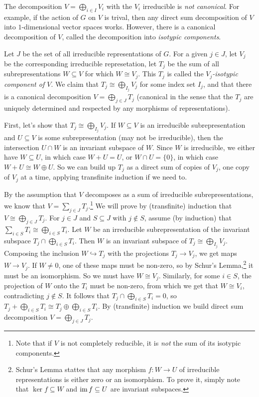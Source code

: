 \begin{remark}\label{lec2Rmk:isotypic}
 The decomposition $V= \bigoplus_{i\in I}V_i$ with the $V_i$ irreducible is \emph{not canonical}. For example, if the action of $G$ on $V$ is trival, then any direct sum decomposition of $V$ into $1$-dimensional vector spaces works. However, there is a canonical decomposition of $V$, called the decomposition into \emph{isotypic components}.
 
 Let $J$ be the set of all irreducible representations of $G$. For a given $j\in J$, let $V_j$ be the corresponding irreducible represetation, let $T_j$ be the sum of all subrepresentations $W\subseteq V$ for which $W\cong V_j$. This $T_j$ is called the \emph{$V_j$-isotypic component of $V$}. We claim that $T_j\cong \bigoplus_{I_j} V_j$ for some index set $I_j$, and that there is a canonical decomposition $V=\bigoplus_{j\in J} T_j$ (canonical in the sense that the $T_j$ are uniquely determined and respected by any morphisms of representations).
 
 First, let's show that $T_j\cong \bigoplus_{I_j} V_j$. If $W\subseteq V$ is an irreducible subrepresentation and $U\subseteq V$ is some subrepresentation (may not be irreducible), then the intersection $U\cap W$ is an invariant subspace of $W$. Since $W$ is irreducible, we either have $W\subseteq U$, in which case $W+U=U$, or $W\cap U=\{0\}$, in which case $W+U\cong W\oplus U$. So we can build up $T_j$ as a direct sum of copies of $V_j$, one copy of $V_j$ at a time, applying transfinite induction if we need to.
 
 By the assumption that $V$ decomposes as a sum of irreducible subrepresentations, we know that $V=\sum_{j\in J} T_j$.\footnote{Note that if $V$ is not completely reducible, it is \emph{not} the sum of its isotypic components.} We will prove by (transfinite) induction that $V\cong \bigoplus_{j\in J}T_j$. For $j\in J$ and $S\subseteq J$ with $j\not\in S$, assume (by induction) that $\sum_{i\in S} T_i\cong \bigoplus_{i\in S}T_i$. Let $W$ be an irreducible subrepresentation of the invariant subspace $T_j\cap \bigoplus_{i\in S}T_i$. Then $W$ is an invariant subspace of $T_j\cong \bigoplus_{I_j} V_j$. Composing the inclusion $W\hookrightarrow T_j$ with the projections $T_j\to V_j$, we get maps $W\to V_j$. If $W\neq 0$, one of these maps must be non-zero, so by Schur's Lemma,\footnote{Schur's Lemma stattes that any morphism $f\colon W\to U$ of irreducible representations is either zero or an isomorphism. To prove it, simply note that $\ker f\subseteq W$ and $\operatorname{im} f\subseteq U$ are invariant subspaces.} it must be an isomorphism. So we must have $W\cong V_j$. Similarly, for some $i\in S$, the projection of $W$ onto the $T_i$ must be non-zero, from which we get that $W\cong V_i$, contradicting $j\not\in S$. It follows that $T_j\cap \bigoplus_{i\in S}T_i=0$, so $T_j+\bigoplus_{i\in S}T_i\cong T_j\oplus\bigoplus_{i\in S}T_i$. By (transfinite) induction we build direct sum decomposition $V=\bigoplus_{j\in J} T_j$. 
 

\end{remark}
